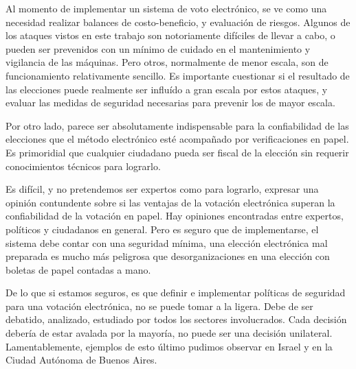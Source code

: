\documentclass[11pt]{article}
\begin{document}
Al momento de implementar un sistema de voto electrónico, se ve como una necesidad realizar balances de costo-beneficio, y evaluación de riesgos. Algunos de los ataques vistos en este trabajo son notoriamente difíciles de llevar a cabo, o pueden ser prevenidos con un mínimo de cuidado en el mantenimiento y vigilancia de las máquinas. Pero otros, normalmente de menor escala, son de funcionamiento relativamente sencillo. Es importante cuestionar si el resultado de las elecciones puede realmente ser influído a gran escala por estos ataques, y evaluar las medidas de seguridad necesarias para prevenir los de mayor escala.

Por otro lado, parece ser absolutamente indispensable para la confiabilidad de las elecciones que el método electrónico esté acompañado por verificaciones en papel. Es primoridial que cualquier ciudadano pueda ser fiscal de la elección sin requerir conocimientos técnicos para lograrlo.

Es difícil, y no pretendemos ser expertos como para lograrlo, expresar una opinión contundente sobre si las ventajas de la votación electrónica superan la confiabilidad de la votación en papel. Hay opiniones encontradas entre expertos, políticos y ciudadanos en general. Pero es seguro que de implementarse, el sistema debe contar con una seguridad mínima, una elección electrónica mal preparada es mucho más peligrosa que desorganizaciones en una elección con boletas de papel contadas a mano.

De lo que si estamos seguros, es que definir e implementar políticas de seguridad para una votación electrónica, no se puede tomar a la ligera. Debe de ser debatido, analizado, estudiado por todos los sectores involucrados. Cada decisión debería de estar avalada por la mayoría, no puede ser una decisión unilateral. Lamentablemente, ejemplos de esto último pudimos observar en Israel y en la Ciudad Autónoma de Buenos Aires. 

\pagebreak
\printbibliography
\end{document}
